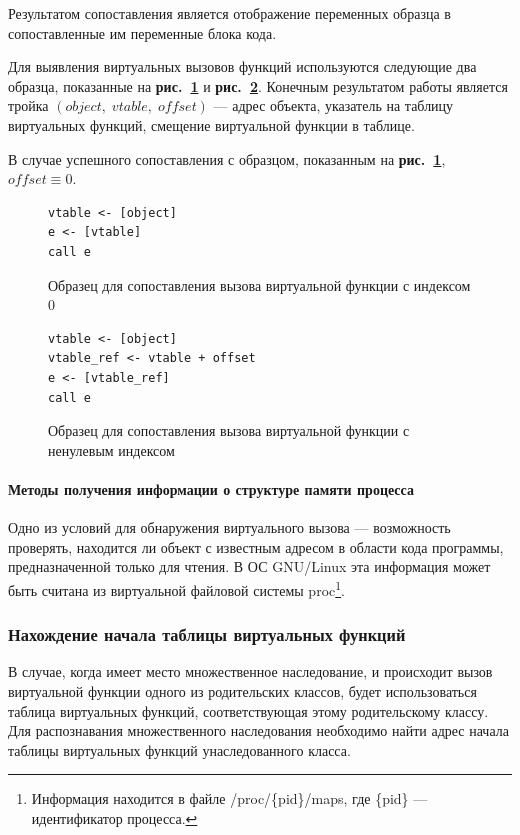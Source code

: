 \documentclass[a4paper,12pt,russian]{article}
\newcommand{\picref}[1]{\textbf{рис.~\ref{#1}}}
\newcommand{\code}[1]{\textsf{#1}}
\begin{document}
Результатом сопоставления является отображение переменных образца в сопоставленные им переменные блока кода.

Для выявления виртуальных вызовов функций используются следующие два образца, показанные на \picref{vcall_pattern_0_lst} и \picref{vcall_pattern_off_lst}. Конечным результатом работы является тройка $(object,\;vtable,\;offset)$ --- адрес объекта, указатель на таблицу виртуальных функций, смещение виртуальной функции в таблице.

В случае успешного сопоставления с  образцом, показанным на \picref{vcall_pattern_0_lst}, $offset \equiv 0$.

\begin{figure}
\begin{lstlisting}
vtable <- [object]
e <- [vtable]
call e
\end{lstlisting}
\caption{Образец для сопоставления вызова виртуальной функции с индексом 0}
\label{vcall_pattern_0_lst}
\end{figure}
\begin{figure}
\begin{lstlisting}
vtable <- [object]
vtable_ref <- vtable + offset
e <- [vtable_ref]
call e
\end{lstlisting}
\caption{Образец для сопоставления вызова виртуальной функции с ненулевым индексом}
\label{vcall_pattern_off_lst}
\end{figure}

\paragraph{Методы получения информации о структуре памяти процесса}
\label{proc_map}
Одно из условий для обнаружения виртуального вызова --- возможность проверять, находится ли объект с известным адресом в области кода программы, предназначенной только для чтения.
В ОС GNU/Linux эта информация может быть считана из виртуальной файловой системы \code{proc}\footnote{Информация находится в файле \code{/proc/\{pid\}/maps}, где \code{\{pid\}} --- идентификатор процесса.}.

\subsubsection{Нахождение начала таблицы виртуальных функций}
\label{vtable_beginning_search}
В случае, когда имеет место множественное наследование, и происходит вызов виртуальной функции одного из родительских классов, будет использоваться таблица виртуальных функций, соответствующая этому родительскому классу.
Для распознавания множественного наследования необходимо найти адрес начала таблицы виртуальных функций унаследованного класса.
\end{document}
